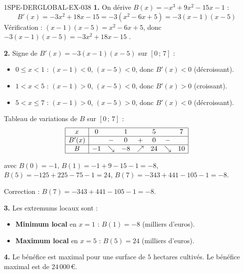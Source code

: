 \begin{corrige}{1SPE-DERGLOBAL-EX-038}
\textbf{1.} On dérive $B(x) = -x^3 + 9x^2 - 15x - 1$ :
\[
B'(x) = -3x^2 + 18x - 15 = -3(x^2 - 6x + 5) = -3(x-1)(x-5)
\]
Vérification : $(x-1)(x-5) = x^2 - 6x + 5$, donc $-3(x-1)(x-5) = -3x^2 + 18x - 15$ \checkmark.

\textbf{2.} Signe de $B'(x) = -3(x-1)(x-5)$ sur $[0\,;\,7]$ :
\begin{itemize}
\item $0 \leqslant x < 1$ : $(x-1) < 0$, $(x-5) < 0$, donc $B'(x) < 0$ (décroissant).
\item $1 < x < 5$ : $(x-1) > 0$, $(x-5) < 0$, donc $B'(x) > 0$ (croissant).
\item $5 < x \leqslant 7$ : $(x-1) > 0$, $(x-5) > 0$, donc $B'(x) < 0$ (décroissant).
\end{itemize}

Tableau de variations de $B$ sur $[0\,;\,7]$ :
\[
\begin{array}{|c|ccccccc|}
\hline
x & 0 & & 1 & & 5 & & 7 \\
\hline
B'(x) & & - & 0 & + & 0 & - & \\
\hline
B & -1 & \searrow & -8 & \nearrow & 24 & \searrow & 10 \\
\hline
\end{array}
\]

avec $B(0) = -1$, $B(1) = -1 + 9 - 15 - 1 = -8$, $B(5) = -125 + 225 - 75 - 1 = 24$, $B(7) = -343 + 441 - 105 - 1 = -8$.

Correction : $B(7) = -343 + 441 - 105 - 1 = -8$.

\textbf{3.} Les extremums locaux sont :
\begin{itemize}
\item \textbf{Minimum local} en $x = 1$ : $B(1) = \boxed{-8}$ (milliers d'euros).
\item \textbf{Maximum local} en $x = 5$ : $B(5) = \boxed{24}$ (milliers d'euros).
\end{itemize}

\textbf{4.} Le bénéfice est maximal pour une surface de $5$ hectares cultivés. Le bénéfice maximal est de $24\,000\,\text{€}$.
\end{corrige}
